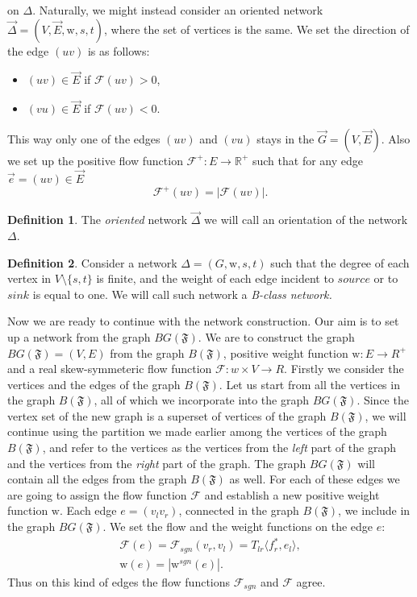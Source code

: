 \documentclass[12pt]{article}
\theoremstyle{definition}
\newtheorem{definition}{Definition}
\newcommand{\fsys}{\mathfrak{F}}
\newcommand{\sgnwt}{\mathrm{w}^{sgn}}
\newcommand{\wt}{\mathrm{w}}
\newcommand{\flow}{\mathcal{F}}
\newcommand{\flowpos}{\mathcal{F^+}}
\newcommand{\flowsgn}{\mathcal{F}_{sgn}}
\newcommand{\source}{\mathit{source}}
\newcommand{\sink}{\mathit{sink}}
\newcommand{\net}{\Delta}
\newcommand{\onet}{\vec{\Delta}}
\numberwithin{remark}{section}
\numberwithin{theorem}{section}
\numberwithin{prop}{section}
\numberwithin{equation}{section}
\numberwithin{lemma}{section}
\numberwithin{prop_under_lemma}{lemma}
\begin{document}
    on $\net$.
    Naturally, we might instead consider an oriented network $\onet = (V, \vec{E}, \wt, s, t)$, where
    the set of vertices is the same.
    We set the direction of the edge $(uv)$ is as follows:
    \begin{itemize}
      \item $(uv) \in \vec{E}$ if $\flow(uv) > 0$,
      \item $(vu) \in \vec{E}$ if $\flow(uv) < 0$.
    \end{itemize}
    This way only one of the edges $(uv)$ and $(vu)$ stays in the $\vec{G} = (V, \vec{E})$.
    Also we set up the positive flow function $\flowpos: E \to \mathbb{R}^+$ such that 
    for any edge $\vec{e} = (uv) \in \vec{E}$
    $$
      \flowpos(uv) = |\flow(uv)|.
    $$
    \begin{definition}
      The \emph{oriented} network $\onet$ we will call an orientation of the network $\net$.
    \end{definition}
    \begin{definition}
      Consider a network $\net = (G, \wt, s, t)$ such that
      the degree of each vertex in $V \setminus \{s, t\} $ is finite,
      and the weight of each edge incident to $\source$ or to $\sink$ is equal to one.
      We will call such network a \it{B-class network}.
    \end{definition}
    
    Now we are ready to continue with the network construction.
    Our aim is to set up a network from the graph $BG(\fsys)$.
    We are to construct the graph $BG(\fsys) = (V, E)$ from the graph $B(\fsys)$,
    positive weight function $\wt: E \to R^{+}$ and a real skew-symmeteric flow function $\flow: w \times V \to R$.
    Firstly we consider the vertices and the edges of the graph $B(\fsys)$.
    Let us start from all the vertices in the graph $B(\fsys)$, all of which we incorporate into the graph $BG(\fsys)$.
    Since the vertex set of the new graph is a superset of vertices of the graph $B(\fsys)$,
    we will continue using the partition we made earlier among the vertices of the graph $B(\fsys)$, and
    refer to the vertices as the vertices from the \textit{left} part of the graph and the vertices from the 
    \textit{right} part of the graph.
    The graph $BG(\fsys)$ will contain all the edges from the graph $B(\fsys)$ as well.
    For each of these edges we are going to assign the flow function $\flow$ and
    establish a new positive weight function $\wt$.
    Each edge $e = (v_l v_r)$, connected in the graph $B(\fsys)$, we include in the graph $BG(\fsys)$.
    We set the flow and the weight functions on the edge $e$:
    \begin{align*}
      \flow(e) = \flowsgn(v_r, v_l) = T_{lr} \langle f^*_r, e_l \rangle,\\
      \wt(e) = \left| \sgnwt(e) \right|.
    \end{align*}
    Thus on this kind of edges the flow functions $\flowsgn$ and $\flow$ agree.
    
\end{document}

